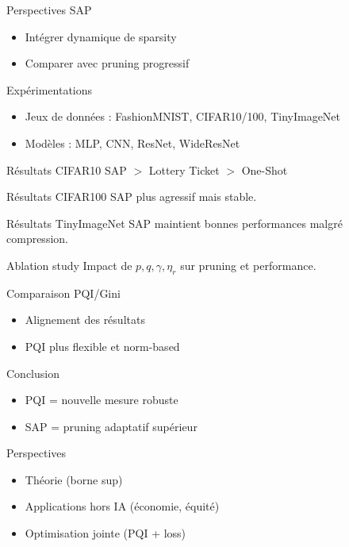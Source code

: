 \documentclass{beamer}
\begin{document}
\begin{frame}{Perspectives SAP}
\begin{itemize}
\item Intégrer dynamique de sparsity
\item Comparer avec pruning progressif
\end{itemize}
\end{frame}

\begin{frame}{Expérimentations}
\begin{itemize}
\item Jeux de données : FashionMNIST, CIFAR10/100, TinyImageNet
\item Modèles : MLP, CNN, ResNet, WideResNet
\end{itemize}
\end{frame}

\begin{frame}{Résultats CIFAR10}
SAP $>$ Lottery Ticket $>$ One-Shot
\end{frame}

\begin{frame}{Résultats CIFAR100}
SAP plus agressif mais stable.
\end{frame}

\begin{frame}{Résultats TinyImageNet}
SAP maintient bonnes performances malgré compression.
\end{frame}

\begin{frame}{Ablation study}
Impact de $p, q, \gamma, \eta_r$ sur pruning et performance.
\end{frame}

\begin{frame}{Comparaison PQI/Gini}
\begin{itemize}
\item Alignement des résultats
\item PQI plus flexible et norm-based
\end{itemize}
\end{frame}

\begin{frame}{Conclusion}
\begin{itemize}
\item PQI = nouvelle mesure robuste
\item SAP = pruning adaptatif supérieur
\end{itemize}
\end{frame}

\begin{frame}{Perspectives}
\begin{itemize}
\item Théorie (borne sup)
\item Applications hors IA (économie, équité)
\item Optimisation jointe (PQI + loss)
\end{itemize}
\end{frame}
\end{document}
